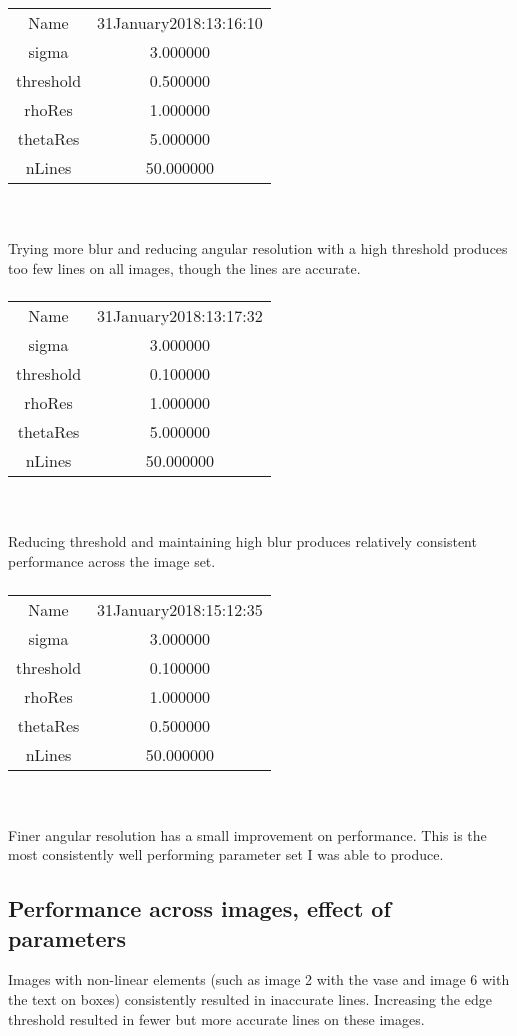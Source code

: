 \documentclass[12pt]{article}
\begin{document}
\subsubsection{}
\begin{tabular} { c c }
Name & 31January2018:13:16:10\\
sigma & 3.000000\\
threshold & 0.500000\\
rhoRes & 1.000000\\
thetaRes & 5.000000\\
nLines & 50.000000
\end{tabular}
\\ \\
Trying more blur and reducing angular resolution with a high threshold produces too few lines on all images, though the lines are accurate.

\subsubsection{}
\begin{tabular} { c c }
Name & 31January2018:13:17:32\\
sigma & 3.000000\\
threshold & 0.100000\\
rhoRes & 1.000000\\
thetaRes & 5.000000\\
nLines & 50.000000
\end{tabular}
\\ \\
Reducing threshold and maintaining high blur produces relatively consistent performance across the image set.

\subsubsection{}
\begin{tabular} { c c }
Name & 31January2018:15:12:35\\
sigma & 3.000000\\
threshold & 0.100000\\
rhoRes & 1.000000\\
thetaRes & 0.500000\\
nLines & 50.000000
\end{tabular}
\\ \\
Finer angular resolution has a small improvement on performance. This is the most consistently well performing parameter set I was able to produce.

\newpage
\subsection{Performance across images, effect of parameters}
Images with non-linear elements (such as image 2 with the vase and image 6 with the text on boxes) consistently resulted in inaccurate lines. Increasing the edge threshold resulted in fewer but more accurate lines on these images.
\end{document}
